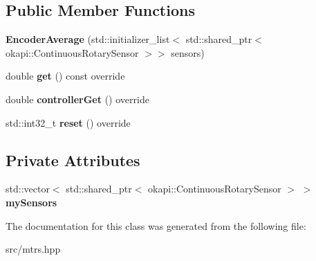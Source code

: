 \subsection*{Public Member Functions}
\begin{DoxyCompactItemize}
\item 
\mbox{\label{classEncoderAverage_a724597f4db6dd249fbb4e1f7e2e72322}} 
{\bfseries Encoder\+Average} (std\+::initializer\+\_\+list$<$ std\+::shared\+\_\+ptr$<$ okapi\+::\+Continuous\+Rotary\+Sensor $>$$>$ sensors)
\item 
\mbox{\label{classEncoderAverage_a5255c50e635177b4ff0589de299965d9}} 
double {\bfseries get} () const override
\item 
\mbox{\label{classEncoderAverage_afe094e54cc09ea812602ad014c2287b0}} 
double {\bfseries controller\+Get} () override
\item 
\mbox{\label{classEncoderAverage_a3f5cb96c7f86a893d10ce6b6e5773ba8}} 
std\+::int32\+\_\+t {\bfseries reset} () override
\end{DoxyCompactItemize}
\subsection*{Private Attributes}
\begin{DoxyCompactItemize}
\item 
\mbox{\label{classEncoderAverage_a58663dbf442771f7e43fbb9ab3d7b902}} 
std\+::vector$<$ std\+::shared\+\_\+ptr$<$ okapi\+::\+Continuous\+Rotary\+Sensor $>$ $>$ {\bfseries my\+Sensors}
\end{DoxyCompactItemize}


The documentation for this class was generated from the following file\+:\begin{DoxyCompactItemize}
\item 
src/mtrs.\+hpp\end{DoxyCompactItemize}
